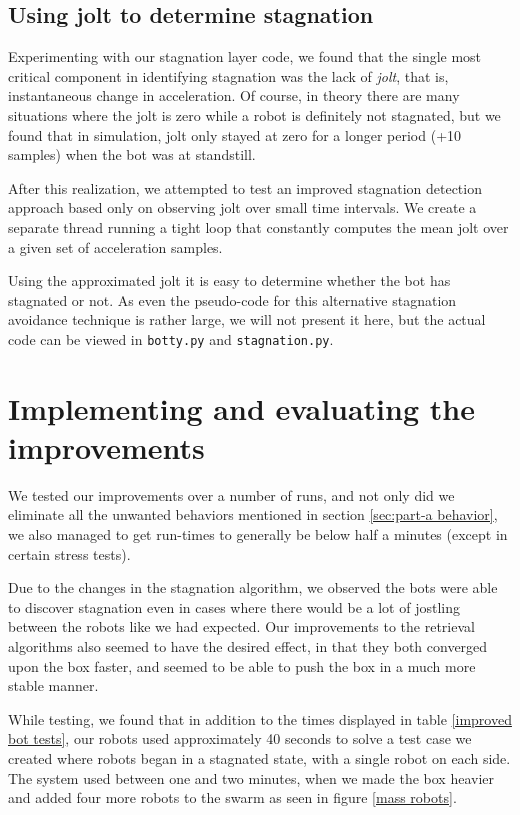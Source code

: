 \documentclass[a4paper,10pt]{article}
\begin{document}
\subsection{Using jolt to determine stagnation}
Experimenting with our stagnation layer code, we found that the single most
critical component in identifying stagnation was the lack of \emph{jolt}, that
is, instantaneous change in acceleration. Of course, in theory there are many
situations where the jolt is zero while a robot is definitely not stagnated,
but we found that in simulation, jolt only stayed at zero for a longer period
(+10 samples) when the bot was at standstill.  

After this realization, we attempted to test an improved stagnation detection
approach based only on observing jolt over small time intervals. We create a
separate thread running a tight loop that constantly computes the mean
jolt over a given set of acceleration samples. 

Using the approximated jolt it is easy to determine whether the bot has
stagnated or not. As even the pseudo-code for this alternative stagnation
avoidance technique is
rather large, we will not present it here, but the actual code can be viewed
in \texttt{botty.py} and \texttt{stagnation.py}.

\section{Implementing and evaluating the improvements}
We tested our improvements over a number of runs, and not only did we eliminate
all the unwanted behaviors  mentioned in section \ref{sec:part-a behavior}, we also managed 
to get run-times to generally be below half a minutes (except in certain stress tests).

Due to the changes in the stagnation algorithm, we observed the bots were able 
to discover stagnation even in cases where there would be a lot of jostling
between the robots like we had expected. Our improvements to the retrieval
algorithms also seemed to have the desired effect, in that they both
converged upon the box faster, and seemed to be able to push the box
in a much more stable manner.

While testing, we found that in addition to the times displayed in table
\ref{improved bot tests}, our robots used approximately 40 seconds to
solve a test case we created where robots began in a stagnated state,
with a single robot on each side. The system used between one and two 
minutes, when we made the box heavier and added four more robots to the swarm as seen
in figure \ref{mass robots}.
\end{document}
